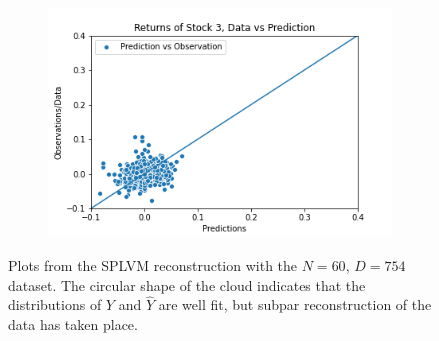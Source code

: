 \begin{figure}
\begin{subfigure}[r]{0.3\textwidth}
		\includegraphics[width=\textwidth]{img/07_1/N100/Q1_kernel1_stock3_scatter.png}
	\end{subfigure}
	\caption[Y-$\hat{Y}$ pair plots for N=100 with the SPLVM model]{Plots from the SPLVM reconstruction with the $N=60$, $D=754$ dataset. The circular shape of the cloud indicates that the distributions of $Y$ and $\hat{Y}$ are well fit, but subpar reconstruction of the data has taken place.}
	\label{fig:studt_N100_pairs}
\end{figure}

